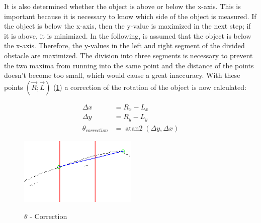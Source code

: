 \documentclass[11pt,oneside,openright]{mpreport}
\DeclareMathOperator{\atantwo}{atan2}
\begin{document}

It is also determined whether the object is above or below the x-axis. This is important because it is necessary to know which side of the object is measured.
If the object is below the x-axis, then the y-value is maximized in the next step; if it is above, it is minimized.
In the following, is assumed that the object is below the x-axis. Therefore, the y-values in the left and right segment of the divided obstacle are maximized.
The division into three segments is necessary to prevent the two maxima from running into the same point and the distance of the points doesn't become too small, 
which would cause a great inaccuracy. With these points $(\vec{R};\vec{L})$ (\cref{obst_correction}) a correction of the rotation of the object is now calculated:

\begin{align*}
\Delta x &= R_x - L_x\\
\Delta y &= R_y - L_y\\
\theta_{correction} &= \atantwo(\Delta y,\Delta x)
\end{align*}

\begin{figure}[!ht]
\begin{center}
\caption{$\theta$ - Correction}
\includegraphics[width=0.5\textwidth]{bilder/obst_devide_angle.png}
\label{obst_correction}
\end{center}
\end{figure}
\end{document}
